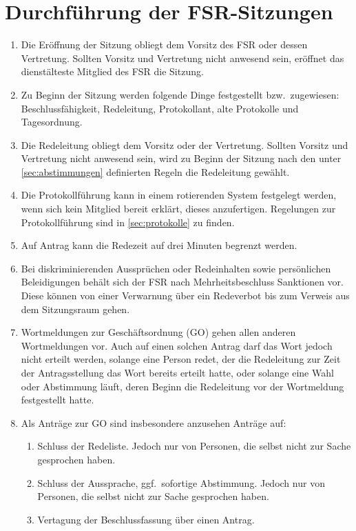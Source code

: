 \documentclass[
	a4paper,
	12pt,
	oneside,
	parskip=half-,
	pagesize,
	headsepline,
	german,
	ngerman
]{scrartcl}
\begin{document}
\section{Durchführung der FSR-Sitzungen}
\label{sec:sitzung_durchführung}
\begin{enumerate}
	\item Die Eröffnung der Sitzung obliegt dem Vorsitz des FSR oder dessen Vertretung. Sollten Vorsitz und Vertretung nicht anwesend sein, eröffnet das dienstälteste Mitglied des FSR die Sitzung.  
	\item Zu Beginn der Sitzung werden folgende Dinge festgestellt bzw.\ zugewiesen: Beschlussfähigkeit, Redeleitung, Protokollant, alte Protokolle und Tagesordnung.
	\item Die Redeleitung obliegt dem Vorsitz oder der Vertretung. Sollten Vorsitz und Vertretung nicht anwesend sein, wird zu Beginn der Sitzung nach den unter \ref{sec:abstimmungen} definierten Regeln die Redeleitung gewählt.
	\item Die Protokollführung kann in einem rotierenden System festgelegt werden, wenn sich kein Mitglied bereit erklärt, dieses anzufertigen. Regelungen zur Protokollführung sind in \ref{sec:protokolle} zu finden.
	\item Auf Antrag kann die Redezeit auf drei Minuten begrenzt werden.
	\item Bei diskriminierenden Aussprüchen oder Redeinhalten sowie persönlichen Beleidigungen behält sich der FSR nach Mehrheitsbeschluss Sanktionen vor. Diese können von einer Verwarnung über ein Redeverbot bis zum Verweis aus dem Sitzungsraum gehen.
	\item Wortmeldungen zur Geschäftsordnung (GO) gehen allen anderen Wortmeldungen vor. Auch auf einen solchen Antrag darf das Wort jedoch nicht erteilt werden, solange eine Person redet, der die Redeleitung zur Zeit der Antragsstellung das Wort bereits erteilt hatte, oder solange eine Wahl oder Abstimmung läuft, deren Beginn die Redeleitung vor der Wortmeldung festgestellt hatte.
	\item Als Anträge zur GO sind insbesondere anzusehen Anträge auf:
	\begin{enumerate}
		\item Schluss der Redeliste. Jedoch nur von Personen, die selbst nicht zur Sache gesprochen haben.
		\item Schluss der Aussprache, ggf.\ sofortige Abstimmung. Jedoch nur von Personen, die selbst nicht zur Sache gesprochen haben.
		\item Vertagung der Beschlussfassung über einen Antrag.

\end{enumerate}
\end{enumerate}
\end{document}
